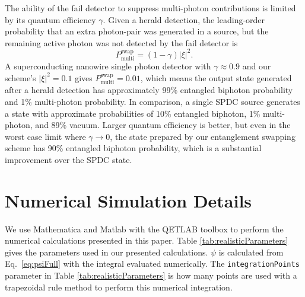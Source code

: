 \documentclass[twocolumn,amssymb, nobibnotes, showpacs, aps, pra,10pt]{revtex4-1}
\begin{document}
The ability of the fail detector to suppress multi-photon contributions is limited by its quantum efficiency $\gamma$. Given a herald detection, the leading-order probability that an extra photon-pair was generated in a source, but the remaining active photon was not detected by the fail detector is
\begin{equation}
P^{\text{swap}}_{\text{multi}} = (1 - \gamma) |\xi|^2.
\end{equation}
A superconducting nanowire single photon detector with $\gamma \approx 0.9$ and our scheme's $|\xi|^2 = 0.1$ gives $P^{\text{swap}}_{\text{multi}} = 0.01$, which means the output state generated after a herald detection has approximately 99\% entangled biphoton probability and 1\% multi-photon probability. In comparison, a single SPDC source generates a state with approximate probabilities of 10\% entangled biphoton, 1\% multi-photon, and 89\% vacuum. Larger quantum efficiency is better, but even in the worst case limit where $\gamma \to 0$, the state prepared by our entanglement swapping scheme has 90\% entangled biphoton probability, which is a substantial improvement over the SPDC state.


\section{Numerical Simulation Details} \label{sec:Simulation} 
We use Mathematica \cite{Mathematica} and Matlab \cite{Matlab} with the QETLAB toolbox \cite{QETLAB} to perform the numerical calculations presented in this paper. Table \ref{tab:realisticParameters} gives the parameters used in our presented calculations. $\psi$ is calculated from Eq.\ \eqref{eq:psiFull} with the integral evaluated numerically. The {\tt integrationPoints} parameter in Table \ref{tab:realisticParameters} is how many points are used with a trapezoidal rule method to perform this numerical integration.
\end{document}
